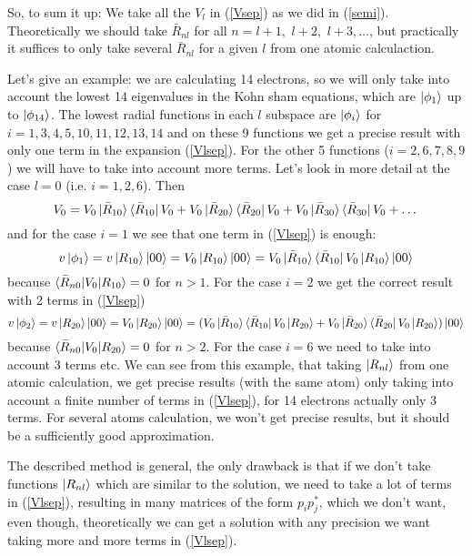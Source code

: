 So, to sum it up: We take all the $V_l$ in (\ref{Vsep}) as we did in (\ref{semi}). Theoretically we should take $\bar R_{nl}$ for all $n=l+1,\,\, l+2,\,\,l+3,\dots$, but practically it suffices to only take several $\bar R_{nl}$ for a given $l$ from one atomic calculaction.

Let's give an example: we are calculating 14 electrons, so we will only take into account the lowest 14 eigenvalues in the Kohn sham equations, which are $\mathinner{|{\phi_1}\rangle}$ up to $\mathinner{|{\phi_{14}}\rangle}$. The lowest radial functions in each $l$ subspace are $\mathinner{|{\phi_i}\rangle}$ for $i=1,3,4,5,10,11,12,13,14$ and on these 9 functions we get a precise result with only one term in the expansion (\ref{Vlsep}). For the other 5 functions ($i=2,6,7,8,9$) we will have to take into account more terms. Let's look in more detail at the case $l=0$ (i.e. $i=1,2,6$). Then 
\begin{equation*}
  V_0= V_0\mathinner{|{\bar R_{10}}\rangle}\mathinner{\langle{\bar R_{10}}|}V_0+ V_0\mathinner{|{\bar R_{20}}\rangle}\mathinner{\langle{\bar R_{20}}|}V_0+ V_0\mathinner{|{\bar R_{30}}\rangle}\mathinner{\langle{\bar R_{30}}|}V_0+ \dots
\end{equation*}
and for the case $i=1$ we see that one term in (\ref{Vlsep}) is enough: 
\begin{equation*}
  v\mathinner{|{\phi_1}\rangle}=v\mathinner{|{R_{10}}\rangle}\mathinner{|{00}\rangle}=V_0\mathinner{|{R_{10}}\rangle}\mathinner{|{00}\rangle}= V_0\mathinner{|{\bar R_{10}}\rangle}\mathinner{\langle{\bar R_{10}}|}V_0\mathinner{|{R_{10}}\rangle}\mathinner{|{00}\rangle}
\end{equation*}
because $\mathinner{\langle{\bar R_{n0}|V_0|R_{10}}\rangle}=0$ for $n>1$. For the case $i=2$ we get the correct result with 2 terms in (\ref{Vlsep})
\begin{equation*}
  v\mathinner{|{\phi_2}\rangle}=v\mathinner{|{R_{20}}\rangle}\mathinner{|{00}\rangle}=V_0\mathinner{|{R_{20}}\rangle}\mathinner{|{00}\rangle}=( V_0\mathinner{|{\bar R_{10}}\rangle}\mathinner{\langle{\bar R_{10}}|}V_0\mathinner{|{R_{20}}\rangle}+ V_0\mathinner{|{\bar R_{20}}\rangle}\mathinner{\langle{\bar R_{20}}|}V_0\mathinner{|{R_{20}}\rangle} )\mathinner{|{00}\rangle}
\end{equation*}
because $\mathinner{\langle{\bar R_{n0}|V_0|R_{20}}\rangle}=0$ for $n>2$. For the case $i=6$ we need to take into account 3 terms etc. We can see from this example, that taking $\mathinner{|{R_{nl}}\rangle}$ from one atomic calculation, we get precise results (with the same atom) only taking into account a finite number of terms in (\ref{Vlsep}), for 14 electrons actually only 3 terms. For several atoms calculation, we won't get precise results, but it should be a sufficiently good approximation.

The described method is general, the only drawback is that if we don't take functions $\mathinner{|{R_{nl}}\rangle}$ which are similar to the solution, we need to take a lot of terms in (\ref{Vlsep}), resulting in many matrices of the form $p_ip_j^*$, which we don't want, even though, theoretically we can get a solution with any precision we want taking more and more terms in (\ref{Vlsep}).

